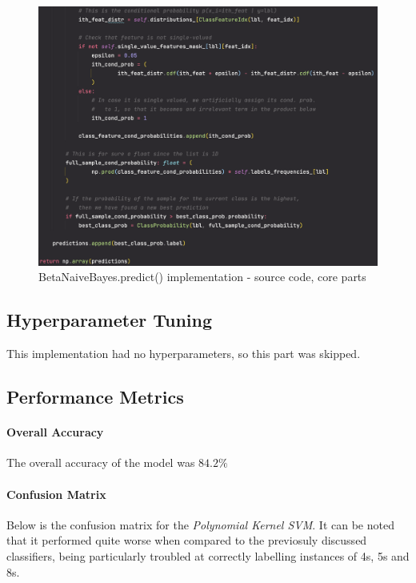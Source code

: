\begin{figure}[h]
    \centering
    \includegraphics[scale=0.55]{images/exp-results/bayes/bayes-predict.png}
    \caption{BetaNaiveBayes.predict() implementation - source code, core parts}
    \label{fig:exp_res_bayes_predict}
\end{figure}


\subsection{Hyperparameter Tuning}

This implementation had no hyperparameters, so this part was skipped.

\subsection{Performance Metrics}

\paragraph{Overall Accuracy} The overall accuracy of the model was $84.2\%$

\paragraph{Confusion Matrix} Below is the confusion matrix for the \textit{Polynomial Kernel SVM}. It can be noted that it performed quite worse when compared to the previosuly discussed classifiers, being particularly troubled at correctly labelling instances of 4s, 5s and 8s.

